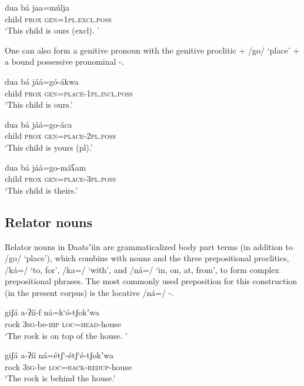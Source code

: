 \documentclass[output=paper]{langsci/langscibook}
\begin{document}
\ea\label{ex:ahlandc:59}
\gll
dua  bá  jaa=m\'{u}lja \\
child  \textsc{prox} \textsc{gen=1pl.excl.poss}  \\
\glt
‘This child is ours (excl). ’
\z

One can also form a genitive pronoun with the genitive proclitic + /go/ ‘place’ + a bound possessive pronominal -.

\ea\label{ex:ahlandc:60}
\gll
dua   bá       jáá=g\'{o}-ákwa \\
child \textsc{prox}  \textsc{gen}\textsc{=place-1pl.incl.poss} \\
\glt
‘This child is ours.’
\z

\ea\label{ex:ahlandc:61}
\gll 
dua   bá       jáá=go-áca \\
child \textsc{prox} \textsc{gen}\textsc{=place-2pl.poss} \\
\glt
‘This child is yours (pl).’
\z

\ea\label{ex:ahlandc:62}
\gll
dua   bá       jáá=go-máʕam \\
child \textsc{prox} \textsc{gen}\textsc{=place-3pl.poss}  \\
\glt
‘This child is theirs.’
\z

\subsection{Relator nouns}\label{sec:ahlandc:10.2}

Relator nouns in Daatsʼíin are grammaticalized body part terms (in addition to /go/ ‘place’), which combine with nouns and the three prepositional proclitics, /ká=/ ‘to, for’, /ka=/ ‘with’, and /n\'{a}=/ ‘in, on, at, from’, to form complex prepositional phrases. The most commonly used preposition for this construction (in the present corpus) is the locative /ná=/ -. 

\ea\label{ex:ahlandc:63}
\gll
giʃá  a-ʔíí-f    ná=k‘\'{o}-tʃokʼwa \\
rock \textsc{3sg}{}-be-\textsc{hip}  \textsc{loc}\textsc{=head}{}-house \\
\glt
‘The rock is on top of the house. ’
\z

\ea\label{ex:ahlandc:64}
\gll
giʃá  a-ʔíí    ná=étʃ‘-étʃ‘é-tʃokʼwa \\
rock   3\textsc{sg}{}-be    \textsc{loc}=\textsc{back}{}-\textsc{redup}{}-house \\
\glt
‘The rock is behind the house.’
\z
\end{document}
